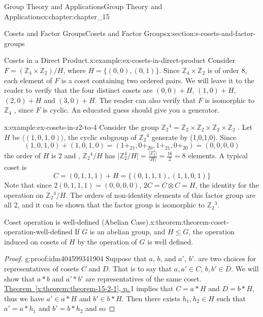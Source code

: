 \documentclass[twoside,10pt,]{book}
\newcommand{\xreffont}{\relax}
\numberwithin{equation}{section}
\begin{document}
\begin{chapterptx}{Group Theory and Applications}{}{Group Theory and Applications}{}{}{x:chapter:chapter_15}
\begin{sectionptx}{Cosets and Factor Groups}{}{Cosets and Factor Groups}{}{}{x:section:s-cosets-and-factor-groups}
\begin{example}{Cosets in a Direct Product.}{x:example:ex-cosets-in-direct-product}
Consider \(F = (\mathbb{Z}_4\times  \mathbb{Z}_2 )/H\), where \(H=\{(0,0),(0,1)\}\). Since \(\mathbb{Z}_4 \times \mathbb{Z}_2\) is of order 8, each element of \(F\) is a coset containing two ordered pairs. We will leave it to the reader to verify that the four distinct cosets are \((0, 0)+H\),  \((1,0) +H\), \((2, 0)+H\) and  \((3, 0)+H\). The reader can also verify that \(F\) is isomorphic to \(\mathbb{Z}_4\) , since \(F\) is cyclic. An educated guess should give you a generator.%
\end{example}
\begin{example}{}{x:example:ex-cosets-in-z2-to-4}%
Consider the group \(\mathbb{Z}_2{}^4 = \mathbb{Z}_2\times \mathbb{Z}_2\times \mathbb{Z}_2\times \mathbb{Z}_2\) . Let \(H\) be \(\langle (1,0,1, 0)\rangle\), the cyclic subgroup of \(\mathbb{Z}_2{}^4\) generate by (1,0,1,0). Since%
\begin{equation*}
(1,0,1, 0)+(1,0,1, 0)=(1+_21,0+_20,1+_21,0+_20) = (0,0,0,0)
\end{equation*}
the order of \(H\) is 2 and , \(\mathbb{Z}_2{}^4/H\) has \(\lvert \mathbb{Z}_2^4 /H\rvert =\frac{\lvert
\mathbb{Z}_2^4\rvert }{\lvert H\rvert }=\frac{16}{2}= 8\) elements. A typical coset is%
\begin{equation*}
C = (0, 1, 1, 1)+H = \{(0, 1, 1, 1), (1, 1, 0, 1)\}
\end{equation*}
Note that since \(2(0, 1, 1, 1) = (0, 0, 0, 0)\), \(2C = C\otimes C = H\), the identity for the operation on  \(\mathbb{Z}_2{}^4/H\). The orders of non-identity elements of this factor group are all 2, and it can be shown that the factor group is isomorphic to \(\mathbb{Z}_2{}^3\).%
\end{example}
\begin{theorem}{Coset operation is well-defined (Abelian Case).}{}{x:theorem:theorem-coset-operation-well-defined}%
If \(G\) is an abelian group, and \(H \leq  G\), the operation induced on cosets of \(H\) by the operation of \(G\) is well defined.%
\end{theorem}
\begin{proof}{}{g:proof:idm404599341904}
Suppose that \(a\), \(b\), and \(a'\), \(b'\).  are two choices for representatives of cosets \(C\) and \(D\). That is to say that \(a, a' \in  C\), \(b, b' \in D\). We will show that \(a*b\) and \(a'*b'\) are representatives of the same coset. \hyperref[x:theorem:theorem-15-2-1]{Theorem~{\xreffont\ref{x:theorem:theorem-15-2-1}}, p.\,\pageref{x:theorem:theorem-15-2-1}}1 implies that \(C = a*H\) and \(D = b*H\), thus we have \(a' \in  a*H\) and \(b' \in  b*H\).  Then there exists \(h_1, h_2 \in  H\) such that  \(a' = a*h_1\)   and \(b' = b*h_2\)  and so%

\end{proof}
\end{sectionptx}
\end{chapterptx}
\end{document}
